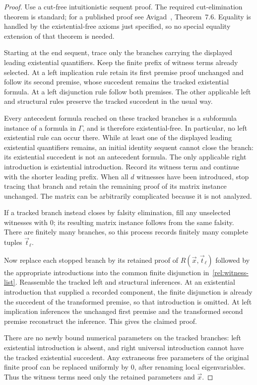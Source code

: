 \begin{proof}
Use a cut-free intuitionistic sequent proof. The required cut-elimination
theorem is standard; for a published proof see
Avigad~\cite{avigad-cut}, Theorem~7.6. Equality is handled by the
existential-free axioms just specified, so no special equality extension
of that theorem is needed.

Starting at the end sequent, trace only the branches carrying the
displayed leading existential quantifiers. Keep the finite prefix of
witness terms already selected. At a left implication rule retain its
first premise proof unchanged and follow its second premise, whose
succedent remains the tracked existential formula. At a left
disjunction rule follow both premises. The other applicable left and
structural rules preserve the tracked succedent in the usual way.

Every antecedent formula reached on these tracked branches is a
subformula instance of a formula in $\Gamma$, and is therefore
existential-free. In particular, no left existential rule can occur
there. While at least one of the displayed leading existential
quantifiers remains, an initial identity sequent cannot close the
branch: its existential succedent is not an antecedent formula. The
only applicable right introduction is existential introduction. Record
its witness term and continue with the shorter leading prefix. When
all $d$ witnesses have been introduced, stop tracing that branch and
retain the remaining proof of its matrix instance unchanged. The
matrix can be arbitrarily complicated because it is not analyzed.

If a tracked branch instead closes by falsity elimination, fill any
unselected witnesses with $0$; its resulting matrix instance follows
from the same falsity. There are finitely many branches, so this process
records finitely many complete tuples $\vec t_\ell$.

Now replace each stopped branch by its retained proof of
$R(\vec x,\vec t_\ell)$ followed by the appropriate introductions into
the common finite disjunction in~\eqref{rel:witness-list}. Reassemble
the tracked left and structural inferences. At an existential
introduction that supplied a recorded component, the finite disjunction
is already the succedent of the transformed premise, so that
introduction is omitted. At left implication inferences the unchanged
first premise and the transformed second premise reconstruct the
inference. This gives the claimed proof.

There are no newly bound numerical parameters on the tracked branches:
left existential introduction is absent, and right universal
introduction cannot have the tracked existential succedent. Any
extraneous free parameters of the original finite proof can be replaced
uniformly by $0$, after renaming local eigenvariables. Thus the witness
terms need only the retained parameters and $\vec x$.
\end{proof}

